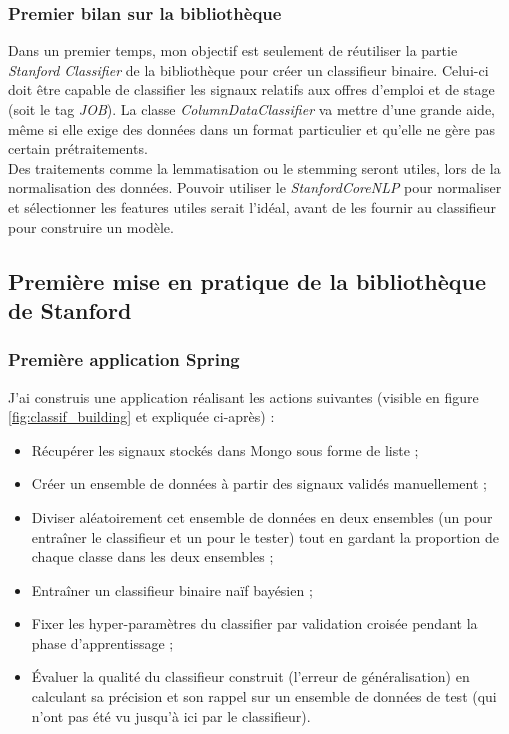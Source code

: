             \subsubsection{Premier bilan sur la bibliothèque}
                Dans un premier temps, mon objectif est seulement de réutiliser la partie \textit{Stanford Classifier} de la bibliothèque pour créer un classifieur binaire. Celui-ci doit être capable de classifier les signaux relatifs aux offres d'emploi et de stage (soit le tag \textit{JOB}). La classe \textit{ColumnDataClassifier} va mettre d'une grande aide, même si elle exige des données dans un format particulier et qu'elle ne gère pas certain prétraitements.\\

                Des traitements comme la lemmatisation ou le stemming seront utiles, lors de la normalisation des données. Pouvoir utiliser le \textit{StanfordCoreNLP} pour normaliser et sélectionner les features utiles serait l'idéal, avant de les fournir au classifieur pour construire un modèle.

        \subsection{Première mise en pratique de la bibliothèque de Stanford}
        \label{ssec:premiere_mise_en_appli}
            \subsubsection{Première application Spring}
                J'ai construis une application réalisant les actions suivantes (visible en figure \ref{fig:classif_building} et expliquée ci-après) :
            \begin{itemize}
                \item Récupérer les signaux stockés dans Mongo sous forme de liste ;
                \item Créer un ensemble de données à partir des signaux validés manuellement ;
                \item Diviser aléatoirement cet ensemble de données en deux ensembles (un pour entraîner le classifieur et un pour le tester) tout en gardant la proportion de chaque classe dans les deux ensembles ;
                \item Entraîner un classifieur binaire naïf bayésien ;
                \item Fixer les hyper-paramètres du classifier par validation croisée pendant la phase d'apprentissage ;
                \item Évaluer la qualité du classifieur construit (l'erreur de généralisation) en calculant sa précision et son rappel sur un ensemble de données de test (qui n'ont pas \og été vu \fg jusqu'à ici par le classifieur).
            \end{itemize}

